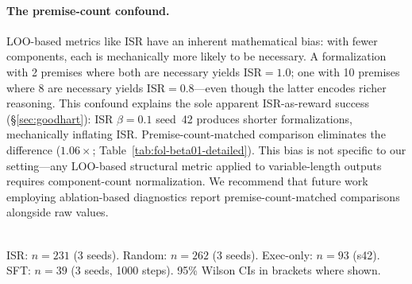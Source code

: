 \paragraph{The premise-count confound.}
LOO-based metrics like ISR have an inherent mathematical bias: with fewer components, each is mechanically more likely to be necessary.
A formalization with 2 premises where both are necessary yields ISR${=}1.0$; one with 10 premises where 8 are necessary yields ISR${=}0.8$---even though the latter encodes richer reasoning.
This confound explains the sole apparent ISR-as-reward success (\S\ref{sec:goodhart}): ISR $\beta{=}0.1$ seed~42 produces shorter formalizations, mechanically inflating ISR.
Premise-count-matched comparison eliminates the difference ($1.06\times$; Table~\ref{tab:fol-beta01-detailed}).
This bias is not specific to our setting---any LOO-based structural metric applied to variable-length outputs requires component-count normalization.
We recommend that future work employing ablation-based diagnostics report premise-count-matched comparisons alongside raw values.

\begin{table}[h]
\centering
\caption{Fisher exact tests for genuine rate across conditions (3-seed pooled). ISR $\beta{=}0.1$ genuine rate is corrected for H8 reclassification and H7 false negatives (Appendix~\ref{app:h8}).}
\label{tab:bootstrap-ci}
\small
{}
\\[2pt]
{\footnotesize ISR: $n{=}231$ (3 seeds). Random: $n{=}262$ (3 seeds). Exec-only: $n{=}93$ (s42). SFT: $n{=}39$ (3 seeds, 1000 steps). 95\% Wilson CIs in brackets where shown.}
\end{table}

